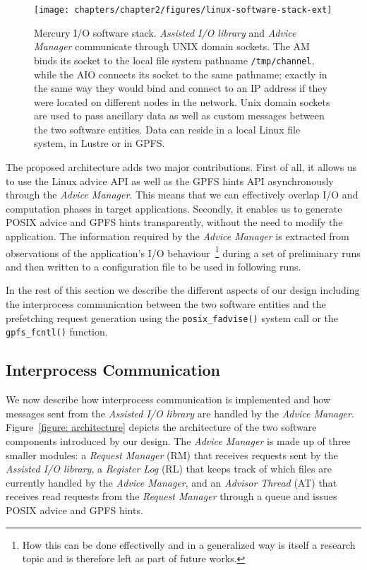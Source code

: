 \begin{figure}[!htb]
  \centering
  \texttt{[image: chapters/chapter2/figures/linux-software-stack-ext]}
  \caption{Mercury I/O software stack. \textit{Assisted I/O library} and \textit{Advice Manager} communicate through UNIX domain sockets. The AM binds its socket to the local file system pathname \texttt{/tmp/channel}, while the AIO connects its socket 
  to the same pathname; exactly in the same way they would bind and connect to an IP address if they were located on different nodes in the network. Unix domain sockets are used to pass ancillary data as well as custom messages between the two software 
  entities. Data can reside in a local Linux file system, in Lustre or in GPFS.}
  \label{figure: softwarestack}
\end{figure}

The proposed architecture adds two major contributions. First of all, it allows us to use the Linux advice API as well as the GPFS hints API asynchronously through the \textit{Advice Manager}. This means that we can effectively overlap I/O and computation 
phases in target applications. Secondly, it enables us to generate POSIX advice and GPFS hints transparently, without the need to modify the application. The information required by the \textit{Advice Manager} is extracted from observations of the application's 
I/O behaviour~\footnote{How this can be done effectivelly and in a generalized way is itself a research topic and is therefore left as part of future works.} during a set of preliminary runs and then written to a configuration file to be used in following runs.

In the rest of this section we describe the different aspects of our design including the interprocess communication between the two software entities and the prefetching request generation using the \texttt{posix\_fadvise()} system call or the 
\texttt{gpfs\_fcntl()} function.

\subsection{Interprocess Communication}
\label{subsec: interprocess_comm}
We now describe how interprocess communication is implemented and how messages sent from the \textit{Assisted I/O library} are handled by the \textit{Advice Manager}. Figure~\ref{figure: architecture} depicts the architecture of the two software components 
introduced by our design. The \textit{Advice Manager} is made up of three smaller modules: a \textit{Request Manager} (RM) that receives requests sent by the \textit{Assisted I/O library}, a \textit{Register Log} (RL) that keeps track of which files are 
currently handled by the \textit{Advice Manager}, and an \textit{Advisor Thread} (AT) that receives read requests from the \textit{Request Manager} through a queue and issues POSIX advice and GPFS hints.

